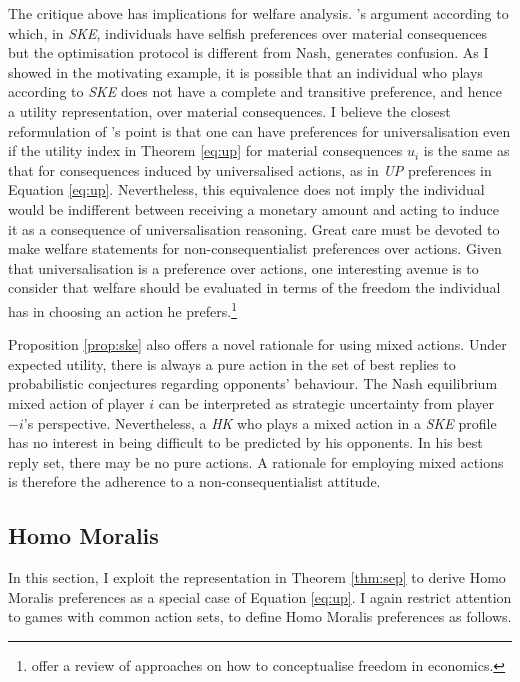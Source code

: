 The critique above has implications for welfare analysis. \citeauthor{roemer2019cooperate}'s argument according to which, in \textit{SKE}, individuals have selfish preferences over material consequences but the optimisation protocol is different from Nash, generates confusion. As I showed in the motivating example, it is possible that an individual who plays according to \textit{SKE} does not have a complete and transitive preference, and hence a utility representation, over material consequences. I believe the closest reformulation of \citeauthor{roemer2019cooperate}'s point is that one can have preferences for universalisation even if the utility index in Theorem \ref{eq:up} for material consequences \( u_i \) is the same as that for consequences induced by universalised actions, as in \textit{UP} preferences in Equation \eqref{eq:up}. Nevertheless, this equivalence does not imply the individual would be indifferent between receiving a monetary amount and acting to induce it as a consequence of universalisation reasoning. Great care must be devoted to make welfare statements for non-consequentialist preferences over actions. Given that universalisation is a preference over actions, one interesting avenue is to consider that welfare should be evaluated in terms of the freedom the individual has in choosing an action he prefers.\footnote{\cite{laslierFreedomEconomics1998} offer a review of approaches on how to conceptualise freedom in economics.}

Proposition \ref{prop:ske} also offers a novel rationale for using mixed actions. Under expected utility, there is always a pure action in the set of best replies to probabilistic conjectures regarding opponents' behaviour. The Nash equilibrium mixed action of player \( i \) can be interpreted as strategic uncertainty from player \( -i \)'s perspective. Nevertheless, a \textit{HK} who plays a mixed action in a \textit{SKE} profile has no interest in being difficult to be predicted by his opponents. In his best reply set, there may be no pure actions. A rationale for employing mixed actions is therefore the adherence to a non-consequentialist attitude.

\subsection{Homo Moralis}\label{subsec:hm}

In this section, I exploit the representation in Theorem \ref{thm:sep} to derive Homo Moralis preferences as a special case of Equation \eqref{eq:up}. I again restrict attention to games with common action sets, to define Homo Moralis preferences as follows.

